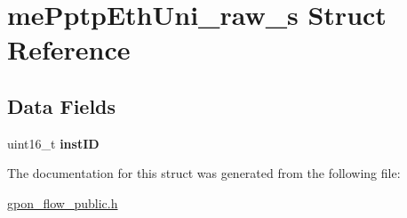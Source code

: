 \hypertarget{structmePptpEthUni__raw__s}{}\section{me\+Pptp\+Eth\+Uni\+\_\+raw\+\_\+s Struct Reference}
\label{structmePptpEthUni__raw__s}
\subsection*{Data Fields}
\begin{DoxyCompactItemize}
\item 
\mbox{\label{structmePptpEthUni__raw__s_a0d1e2d2dbfb5c4f6577c1eaa838e1a5b}} 
uint16\+\_\+t {\bfseries inst\+ID}
\end{DoxyCompactItemize}


The documentation for this struct was generated from the following file\+:\begin{DoxyCompactItemize}
\item 
\hyperlink{gpon__flow__public_8h}{gpon\+\_\+flow\+\_\+public.\+h}\end{DoxyCompactItemize}
